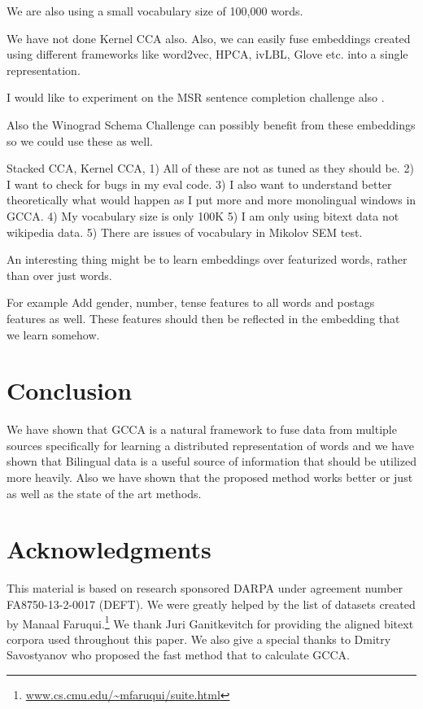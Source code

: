 \documentclass[11pt]{article}
\begin{document}
We are also using a small vocabulary size of 100,000 words.

We have not done Kernel CCA also. Also, we can easily fuse embeddings created using
different frameworks like word2vec, HPCA, ivLBL, Glove etc. into a single representation.

I would like to experiment on the MSR sentence completion challenge
also \cite{zweig2011MSRSCC,zweig2012msrchallenge}.

Also the Winograd Schema Challenge can possibly benefit from these
embeddings so we could use these as well.

Stacked CCA, Kernel CCA,
1) All of these are not as tuned as they should be. 2) I want to check
for bugs in my eval code. 3) I also want to understand better
theoretically what would happen as I put more and more monolingual
windows in GCCA. 4) My vocabulary size is only 100K 5) I am only using
bitext data not wikipedia data. 5) There are issues of vocabulary in
Mikolov SEM test.

An interesting thing might be to learn embeddings over featurized
words, rather than over just words.

For example 
Add gender, number, tense features to all words and postags features as well. 
These features should then be reflected in the embedding that we learn
somehow.

\section{Conclusion}
We have shown that GCCA is a natural framework to fuse data from
multiple sources specifically for learning a distributed
representation of words and we have shown that Bilingual data is a useful
source of information that should be utilized more heavily. Also we
have shown that the proposed method works better or just as well as
the state of the art methods.

\section*{Acknowledgments}
This material is based on research sponsored DARPA under agreement
number FA8750-13-2-0017 (DEFT). We were greatly helped by
the list of datasets created by Manaal
Faruqui.\footnote{\url{www.cs.cmu.edu/~mfaruqui/suite.html}}
We thank Juri Ganitkevitch for providing the aligned bitext corpora
used throughout this paper. We also give a special thanks to Dmitry Savostyanov
who proposed the fast method that to calculate GCCA.



\end{document}
